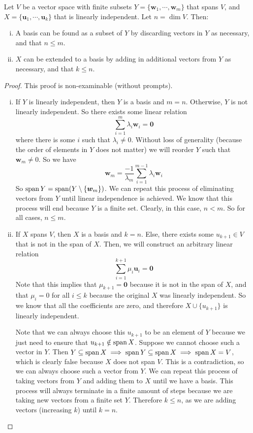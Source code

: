 \documentclass{article}
\begin{document}
	\begin{proposition}
		Let $V$ be a vector space with finite subsets $Y = \{ \bm w_1, \cdots, \bm w_m \}$ that spans $V$, and $X = \{ \bm u_1, \cdots, \bm u_k \}$ that is linearly independent. Let $n = \dim V$. Then:
		\begin{enumerate}[(i)]
			\item A basis can be found as a subset of $Y$ by discarding vectors in $Y$ as necessary, and that $n \leq m$.
			\item $X$ can be extended to a basis by adding in additional vectors from $Y$ as necessary, and that $k \leq n$.
		\end{enumerate}
	\end{proposition}
	\begin{proof}
		This proof is non-examinable (without prompts).
		\begin{enumerate}[(i)]
			\item If $Y$ is linearly independent, then $Y$ is a basis and $m = n$. Otherwise, $Y$ is not linearly independent. So there exists some linear relation
			\[ \sum_{i=1}^{m} \lambda_i \bm w_i = \bm 0 \]
			where there is some $i$ such that $\lambda_i \neq 0$. Without loss of generality (because the order of elements in $Y$ does not matter) we will reorder $Y$ such that $\bm w_m \neq 0$. So we have
			\[ \bm w_m = \frac{-1}{\lambda_m} \sum_{i=1}^{m-1} \lambda_i \bm w_i \]
			So $\operatorname{span} Y = \operatorname{span} (Y \setminus \{ \bm w_m \})$. We can repeat this process of eliminating vectors from $Y$ until linear independence is achieved. We know that this process will end because $Y$ is a finite set. Clearly, in this case, $n < m$. So for all cases, $n \leq m$.
			
			\item If $X$ spans $V$, then $X$ is a basis and $k=n$. Else, there exists some $u_{k+1} \in V$ that is not in the span of $X$. Then, we will construct an arbitrary linear relation
			\[ \sum_{i=1}^{k+1} \mu_i \bm u_i = \bm 0 \]
			Note that this implies that $\mu_{k+1} = \bm 0$ because it is not in the span of $X$, and that $\mu_i = 0$ for all $i \leq k$ because the original $X$ was linearly independent. So we know that all the coefficients are zero, and therefore $X \cup \{ u_{k+1} \}$ is linearly independent.
			
			Note that we can always choose this $u_{k+1}$ to be an element of $Y$ because we just need to ensure that $u_{k+1} \notin \operatorname{span} X$. Suppose we cannot choose such a vector in $Y$. Then $Y \subseteq \operatorname{span} X \implies \operatorname{span} Y \subseteq \operatorname{span} X \implies \operatorname{span} X = V$, which is clearly false because $X$ does not span $V$. This is a contradiction, so we can always choose such a vector from $Y$. We can repeat this process of taking vectors from $Y$ and adding them to $X$ until we have a basis. This process will always terminate in a finite amount of steps because we are taking new vectors from a finite set $Y$. Therefore $k \leq n$, as we are adding vectors (increasing $k$) until $k=n$.
		\end{enumerate}
	\end{proof}
\end{document}
